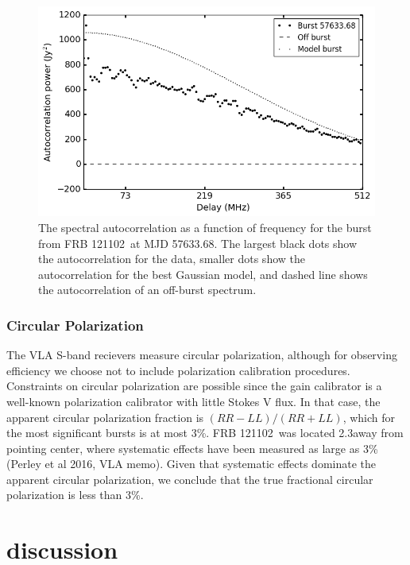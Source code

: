 \documentclass[twocolumn]{aastex61}
\newcommand{\frb}{FRB 121102}
\begin{document}

\begin{figure}[htb]
\begin{center}
\includegraphics[width=0.9\columnwidth]{acf_57633_scan7}
\caption{The spectral autocorrelation as a function of frequency for the burst from \frb\ at MJD 57633.68. The largest black dots show the autocorrelation for the data, smaller dots show the autocorrelation for the best Gaussian model, and dashed line shows the autocorrelation of an off-burst spectrum.
\label{fig:acf}}
\end{center}
\end{figure}

\subsubsection{Circular Polarization}
The VLA S-band recievers measure circular polarization, although for observing efficiency we choose not to include polarization calibration procedures. Constraints on circular polarization are possible since the gain calibrator is a well-known polarization calibrator with little Stokes V flux. In that case, the apparent circular polarization fraction is $(RR-LL)/(RR+LL)$, which for the most significant bursts is at most 3\%. \frb\ was located 2.3\arcmin away from pointing center, where systematic effects have been measured as large as 3\% (Perley et al 2016, VLA memo). Given that systematic effects dominate the apparent circular polarization, we conclude that the true fractional circular polarization is less than 3\%.

\section{discussion}
\label{sec:disc}
\end{document}
